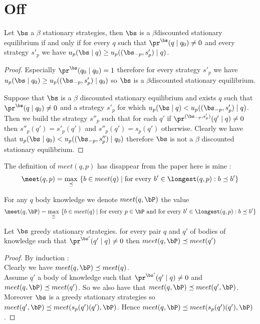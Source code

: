 

\section{Off}
\begin{mylem}
	Let $\bs$ a $\beta$ stationary strategies, then $\bs$ is a $\beta $discounted stationary equilibrium if and only if for every $q$ such that $\pr^{\bs}(q \mid q_0) \neq 0$ and every strategy $s'_p$ we have $u_p(\bs \mid q) \geq u_p((\bs_{-p},s'_p) \mid q)$.
\end{mylem}
\begin{proof}
	Especially $\pr^{\bs}(q_0 \mid q_0) = 1$ therefore for every strategy $s'_p$ we have $u_p(\bs \mid q_0) \geq u_p((\bs_{-p},s'_p) \mid q_0)$ so $\bs$ is a $\beta $discounted stationary equilibrium.
	
	Suppose that $\bs$ is a $\beta$ discounted stationary equilibrium and exists $q$ such that $\pr^{\bs}(q \mid q_0) \neq 0$ and a strategy $s'_p$ for which $u_p(\bs \mid q) < u_p((\bs_{-p},s'_p) \mid q)$.
	Then we build the strategy $s''_p$ such that for each $q'$ if $\pr^{(\bs_{-p},s'_p)}(q' \mid q) \neq 0$ then $s''_p(q') = s'_p(q')$ and $s''_p(q') = s_p(q')$ otherwise. Clearly we have that $u_p(\bs \mid q_0) < u_p((\bs_{-p},s''_p) \mid q_0)$ therefore $\bs$ is not a $\beta$ discounted stationary equilibrium.
\end{proof}

The definition of $meet(q,p)$ has disappear from the paper here is mine :  
$$\meet(q,p)  =  {\displaystyle \max_{\preceq} \ \{b \in meet(q) \mid  \text{for every } b' \in \longest(q,p): b \preceq b'\}}$$

For any $q$ body knowledge we denote
$meet(q,\bP)$ the value $$\meet(q,\bP)  =  {\displaystyle \max_{\preceq} \ \{b \in meet(q) \mid \text{for every } p\in \bP \text{ and for every } b' \in \longest(q,p): b \preceq b'\}}$$

\begin{mylem}
	\label{lem-meet}
	Let $\bs$ greedy stationary strategies. for every pair $q$ and $q'$ of bodies of knowledge such that $\pr^{\bs'}(q' \mid q) \neq 0$ then $meet(q,\bP) \preceq meet(q')$
\end{mylem}	
\begin{proof}
	By induction : 
	\\Clearly we have $meet(q,\bP) \preceq meet(q)$.
	\\Assume $q'$ a body of knowledge such that $\pr^{\bs'}(q' \mid q) \neq 0$ and $meet(q,\bP) \preceq meet(q')$. So we also have that $meet(q,\bP) \preceq meet(q',\bP)$. Moreover $\bs$ is a greedy stationary strategies so $meet(q',\bP) \preceq meet(s_p(q')(q'),\bP)$. Hence $meet(q,\bP) \preceq meet(s_p(q')(q'),\bP)$.
	
\end{proof}

